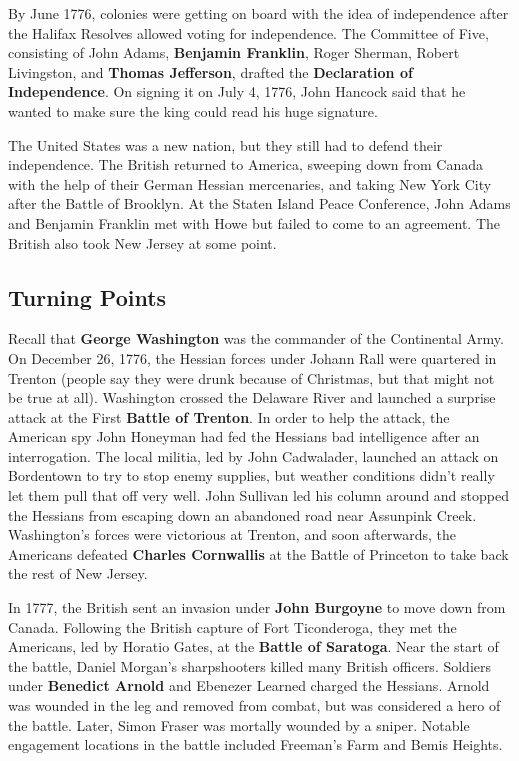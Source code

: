 By June 1776, colonies were getting on board with the idea of independence
after the Halifax Resolves allowed voting for independence.
The Committee of Five, consisting of
John Adams,
\textbf{Benjamin Franklin},
Roger Sherman,
Robert Livingston,
and \textbf{Thomas Jefferson},
drafted the \textbf{Declaration of Independence}.
On signing it on July 4, 1776,
John Hancock said that he wanted to make sure the king could read his huge signature.

The United States was a new nation, but they still had to defend their independence.
The British returned to America,
sweeping down from Canada with the help of their German Hessian mercenaries,
and taking New York City after the Battle of Brooklyn.
At the Staten Island Peace Conference, John Adams and Benjamin Franklin met with Howe
but failed to come to an agreement.
The British also took New Jersey at some point.

\subsection*{Turning Points}

Recall that \textbf{George Washington} was the commander of the Continental Army.
On December 26, 1776, the Hessian forces under Johann Rall were quartered in Trenton
(people say they were drunk because of Christmas, but that might not be true at all).
Washington crossed the Delaware River and launched a surprise attack at the First \textbf{Battle of Trenton}.
In order to help the attack,
the American spy John Honeyman had fed the Hessians bad intelligence after an interrogation.
The local militia, led by John Cadwalader, launched an attack on Bordentown to try to stop enemy supplies,
but weather conditions didn't really let them pull that off very well.
John Sullivan led his column around
and stopped the Hessians from escaping down an abandoned road near Assunpink Creek.
Washington's forces were victorious at Trenton,
and soon afterwards,
the Americans defeated \textbf{Charles Cornwallis} at the Battle of Princeton to take back the rest of New Jersey.

In 1777, the British sent an invasion under \textbf{John Burgoyne} to move down from Canada.
Following the British capture of Fort Ticonderoga,
they met the Americans, led by Horatio Gates, at the \textbf{Battle of Saratoga}.
Near the start of the battle, Daniel Morgan's sharpshooters killed many British officers.
Soldiers under \textbf{Benedict Arnold} and Ebenezer Learned charged the Hessians.
Arnold was wounded in the leg and removed from combat, but was considered a hero of the battle.
Later, Simon Fraser was mortally wounded by a sniper.
Notable engagement locations in the battle included Freeman's Farm and Bemis Heights.

